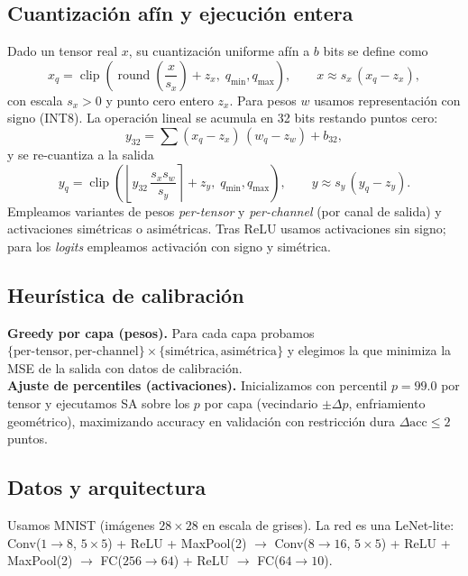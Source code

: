 \subsection*{Cuantización afín y ejecución entera}
Dado un tensor real $x$, su cuantización uniforme afín a $b$ bits se define como
\[
x_q=\operatorname{clip}\!\left(\operatorname{round}\!\left(\frac{x}{s_x}\right)+z_x,\;q_{\min},q_{\max}\right),\qquad
x\approx s_x\,(x_q-z_x),
\]
con escala $s_x>0$ y punto cero entero $z_x$. Para pesos $w$ usamos representación con signo (INT8). La operación lineal se acumula en 32 bits restando puntos cero:
\[
y_{32}=\sum (x_q - z_x)\,(w_q - z_w) + b_{32},
\]
y se re-cuantiza a la salida
\[
y_q=\operatorname{clip}\!\left(\left\lfloor y_{32}\,\frac{s_x s_w}{s_y}\right\rceil + z_y,\;q_{\min},q_{\max}\right),\qquad
y\approx s_y\,(y_q-z_y).
\]
Empleamos variantes de pesos \emph{per-tensor} y \emph{per-channel} (por canal de salida) y activaciones simétricas o asimétricas. Tras ReLU usamos activaciones sin signo; para los \emph{logits} empleamos activación con signo y simétrica.

\subsection*{Heurística de calibración}
\textbf{Greedy por capa (pesos).} Para cada capa probamos $\{\text{per-tensor},\text{per-channel}\}\times\{\text{simétrica},\text{asimétrica}\}$ y elegimos la que minimiza la MSE de la salida con datos de calibración.\\
\textbf{Ajuste de percentiles (activaciones).} Inicializamos con percentil $p=99.0$ por tensor y ejecutamos SA sobre los $p$ por capa (vecindario $\pm\Delta p$, enfriamiento geométrico), maximizando accuracy en validación con restricción dura $\Delta\mathrm{acc}\leq 2$ puntos.

\subsection*{Datos y arquitectura}
Usamos MNIST (imágenes $28{\times}28$ en escala de grises). La red es una LeNet-lite: Conv($1{\rightarrow}8$, $5{\times}5$) + ReLU + MaxPool(2) $\rightarrow$ Conv($8{\rightarrow}16$, $5{\times}5$) + ReLU + MaxPool(2) $\rightarrow$ FC($256{\rightarrow}64$) + ReLU $\rightarrow$ FC($64{\rightarrow}10$).
